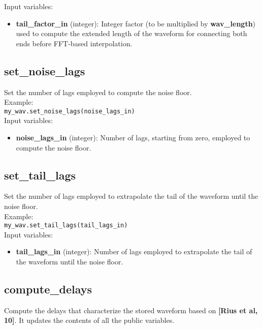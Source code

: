 Input variables:
\begin{itemize}
\item {\bf tail\_factor\_in} (integer): Integer factor (to be multiplied by {\bf wav\_length}) used to compute the extended length of the waveform for connecting both ends before FFT-based interpolation.
\end{itemize}


\subsection{set\_noise\_lags}

Set the number of lags employed to compute the noise floor.\\

Example:\\

\texttt{my\_wav.set\_noise\_lags(noise\_lags\_in)}\\

Input variables:
\begin{itemize}
\item {\bf noise\_lags\_in} (integer): Number of lags, starting from zero, employed to compute the noise floor.
\end{itemize}


\subsection{set\_tail\_lags}

Set the number of lags employed to extrapolate the tail of the waveform until the noise floor.\\

Example:\\

\texttt{my\_wav.set\_tail\_lags(tail\_lags\_in)}\\

Input variables:
\begin{itemize}
\item {\bf tail\_lags\_in} (integer): Number of lags employed to extrapolate the tail of the waveform until the noise floor.
\end{itemize}


\subsection{compute\_delays}

Compute the delays that characterize the stored waveform based on {\bf [Rius et al, 10]}. It updates the contents of all the public variables.\\

